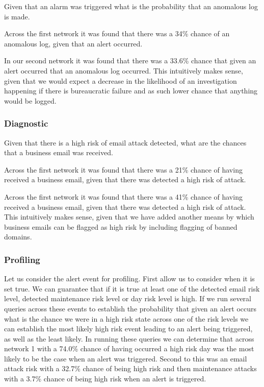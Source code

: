 \documentclass[10pt,a4paper]{article}
\begin{document}
Given that an alarm was triggered what is the probability that an anomalous log is made.

Across the first network it was found that there was a 34\% chance of an anomalous log, given that an alert occurred.

In our second network it was found that there was a 33.6\% chance that given an alert occurred that an anomalous log occurred. This intuitively makes sense, given that we would expect a decrease in the likelihood of an investigation happening if there is bureaucratic failure and as such lower chance that anything would be logged.

\subsubsection{Diagnostic}

Given that there is a high risk of email attack detected, what are the chances that a business email was received.

Across the first network it was found that there was a 21\% chance of having received a business email, given that there was detected a high risk of attack.

Across the first network it was found that there was a 41\% chance of having received a business email, given that there was detected a high risk of attack. This intuitively makes sense, given that we have added another means by which business emails can be flagged as high risk by including flagging of banned domains.

\subsubsection{Profiling}

Let us consider the alert event for profiling. First allow us to consider when it is set true. We can guarantee that if it is true at least one of the detected email risk level, detected maintenance risk level or day risk level is high. If we run several queries across these events to establish the probability that given an alert occurs what is the chance we were in a high risk state across one of the risk levels we can establish the most likely high risk event leading to an alert being triggered, as well as the least likely. In running these queries we can determine that across network 1 with a 74.0\% chance of having occurred a high risk day was the most likely to be the case when an alert was triggered. Second to this was an email attack risk with a 32.7\% chance of being high risk and then maintenance attacks with a 3.7\% chance of being high risk when an alert is triggered.
\end{document}
